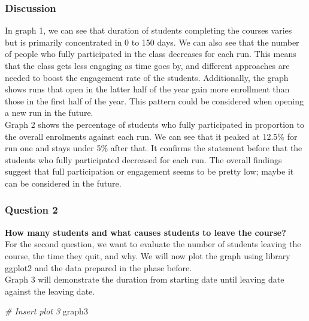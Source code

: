 \documentclass[12pt,]{article}
\newenvironment{Shaded}{\begin{snugshade}}{\end{snugshade}}
\newcommand{\CommentTok}[1]{\textcolor[rgb]{0.56,0.35,0.01}{\textit{#1}}}
\newcommand{\NormalTok}[1]{#1}
\begin{document}
\hypertarget{discussion}{%
\subsubsection{Discussion}\label{discussion}}

In graph 1, we can see that duration of students completing the courses
varies but is primarily concentrated in 0 to 150 days. We can also see
that the number of people who fully participated in the class decreases
for each run. This means that the class gets less engaging as time goes
by, and different approaches are needed to boost the engagement rate of
the students. Additionally, the graph shows runs that open in the latter
half of the year gain more enrollment than those in the first half of
the year. This pattern could be considered when opening a new run in the
future.\\
\hfill\break Graph 2 shows the percentage of students who fully
participated in proportion to the overall enrolments against each run.
We can see that it peaked at 12.5\% for run one and stays under 5\%
after that. It confirms the statement before that the students who fully
participated decreased for each run. The overall findings suggest that
full participation or engagement seems to be pretty low; maybe it can be
considered in the future.

\hypertarget{question-2-1}{%
\subsubsection{Question 2}\label{question-2-1}}

\textbf{How many students and what causes students to leave the
course?}\\
\hfill\break For the second question, we want to evaluate the number of
students leaving the course, the time they quit, and why. We will now
plot the graph using library ggplot2 and the data prepared in the phase
before.\\
\hfill\break Graph 3 will demonstrate the duration from starting date
until leaving date against the leaving date.

\begin{Shaded}
\begin{Highlighting}[]
\CommentTok{\# Insert plot 3}
\NormalTok{graph3}
\end{Highlighting}
\end{Shaded}
\end{document}

